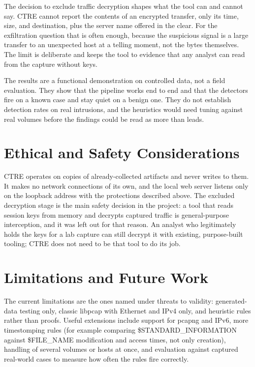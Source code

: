 \documentclass[12pt,onecolumn]{IEEEtran}
\begin{document}
The decision to exclude traffic decryption shapes what the tool can and cannot say. CTRE cannot report the contents of an encrypted transfer, only its time, size, and destination, plus the server name offered in the clear. For the exfiltration question that is often enough, because the suspicious signal is a large transfer to an unexpected host at a telling moment, not the bytes themselves. The limit is deliberate and keeps the tool to evidence that any analyst can read from the capture without keys.

The results are a functional demonstration on controlled data, not a field evaluation. They show that the pipeline works end to end and that the detectors fire on a known case and stay quiet on a benign one. They do not establish detection rates on real intrusions, and the heuristics would need tuning against real volumes before the findings could be read as more than leads.

\section{Ethical and Safety Considerations}
CTRE operates on copies of already-collected artifacts and never writes to them. It makes no network connections of its own, and the local web server listens only on the loopback address with the protections described above. The excluded decryption stage is the main safety decision in the project: a tool that reads session keys from memory and decrypts captured traffic is general-purpose interception, and it was left out for that reason. An analyst who legitimately holds the keys for a lab capture can still decrypt it with existing, purpose-built tooling; CTRE does not need to be that tool to do its job.

\section{Limitations and Future Work}
The current limitations are the ones named under threats to validity: generated-data testing only, classic libpcap with Ethernet and IPv4 only, and heuristic rules rather than proofs. Useful extensions include support for pcapng and IPv6, more timestomping rules (for example comparing \$STANDARD\_INFORMATION against \$FILE\_NAME modification and access times, not only creation), handling of several volumes or hosts at once, and evaluation against captured real-world cases to measure how often the rules fire correctly.
\end{document}
